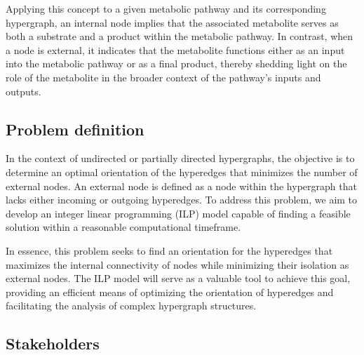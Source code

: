 Applying this concept to a given metabolic pathway and its corresponding hypergraph, an internal node implies that the associated metabolite serves as both a substrate and a product within the metabolic pathway. In contrast, when a node is external, it indicates that the metabolite functions either as an input into the metabolic pathway or as a final product, thereby shedding light on the role of the metabolite in the broader context of the pathway's inputs and outputs.

\subsection{Problem definition}

In the context of undirected or partially directed hypergraphs, the objective is to determine an optimal orientation of the hyperedges that minimizes the number of external nodes. An external node is defined as a node within the hypergraph that lacks either incoming or outgoing hyperedges. To address this problem, we aim to develop an integer linear programming (ILP) model capable of finding a feasible solution within a reasonable computational timeframe.

In essence, this problem seeks to find an orientation for the hyperedges that maximizes the internal connectivity of nodes while minimizing their isolation as external nodes. The ILP model will serve as a valuable tool to achieve this goal, providing an efficient means of optimizing the orientation of hyperedges and facilitating the analysis of complex hypergraph structures.

\subsection{Stakeholders}

